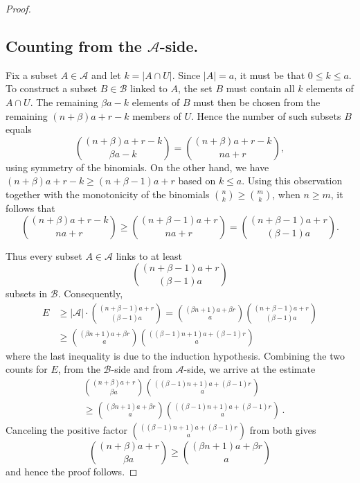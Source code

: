 \documentclass[10pt,a4paper]{amsart}
\begin{document}
\begin{proof}
\subsection*{Counting from the $\mathcal{A}$-side.}
Fix a subset $A\in\mathcal{A}$ and let $k=|A\cap U|$. Since $|A|=a$, it must be that $0\leq k\leq a$.
To construct a subset $B\in\mathcal{B}$ linked to $A$, the set $B$ must contain all $k$ elements of $A\cap U$. 
The remaining $\beta a-k$ elements of $B$ must then be chosen from the remaining $(n+\beta)a+r-k$ members of $U$.
Hence the number of such subsets $B$ equals
$$\binom{(n+\beta)a+r-k}{\beta a-k}=\binom{(n+\beta)a+r-k}{na+r},$$
using symmetry of the binomials. On the other hand, we have $(n+\beta)a+r-k \geq (n+\beta-1)a+r$
based on $k\leq a$. Using this observation together with the monotonicity of the binomials $\binom{n}k\geq\binom{m}k$, when $n\geq m$, it follows that
$$\binom{(n+\beta)a+r-k}{na+r} \geq \binom{(n+\beta-1)a+r}{na+r}=\binom{(n+\beta-1)a+r}{(\beta-1)a}.$$

Thus every subset $A\in\mathcal{A}$ links to at least
$$
\binom{(n+\beta-1)a+r}{(\beta-1)a}
$$
subsets in $\mathcal{B}$. Consequently,
\begin{align*}
 E &\geq |\mathcal{A}|\cdot \binom{(n+\beta-1)a+r}{(\beta-1)a} = \binom{(\beta n+1)a+\beta r}a \binom{(n+\beta-1)a+r}{(\beta-1)a} \\
& \geq \binom{(\beta n+1)a+\beta r}a \binom{((\beta-1)n+1)a+(\beta-1)r}a
\end{align*}
where the last inequality is due to the induction hypothesis. %
Combining the two counts for $E$, from the $\mathcal{B}$-side and from $\mathcal{A}$-side, 
we arrive at the estimate
\begin{align*}
&\binom{(n+\beta)a+r}{\beta a} \binom{((\beta-1)n+1)a+(\beta-1)r}a \\
&\geq \binom{(\beta n+1)a+\beta r}a \binom{((\beta-1)n+1)a+(\beta-1)r}a \, .
\end{align*}
Canceling the positive factor $\binom{((\beta-1)n+1)a+(\beta-1)r}a$ from both gives
$$
\binom{(n+\beta)a+r}{\beta a} \ge \binom{(\beta n+1)a+\beta r}a
$$
and hence the proof follows.
\end{proof}
\end{document}
